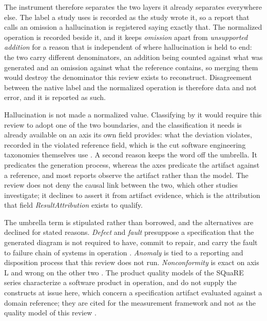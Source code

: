 The instrument therefore separates the two layers it already separates everywhere else. The label a study uses is recorded as the study wrote it, so a report that calls an omission a hallucination is registered saying exactly that. The normalized operation is recorded beside it, and it keeps \textit{omission} apart from \textit{unsupported addition} for a reason that is independent of where hallucination is held to end: the two carry different denominators, an addition being counted against what was generated and an omission against what the reference contains, so merging them would destroy the denominator this review exists to reconstruct. Disagreement between the native label and the normalized operation is therefore data and not error, and it is reported as such.

Hallucination is not made a normalized value. Classifying by it would require this review to adopt one of the two boundaries, and the classification it needs is already available on an axis its own field provides: what the deviation violates, recorded in the violated reference field, which is the cut software engineering taxonomies themselves use \cite{Zhang2025CodeHallucination,Lee2025HallucinationTaxonomy}. A second reason keeps the word off the umbrella. It predicates the generation process, whereas the axes predicate the artifact against a reference, and most reports observe the artifact rather than the model. The review does not deny the causal link between the two, which other studies investigate; it declines to assert it from artifact evidence, which is the attribution that field \textit{ResultAttribution} exists to qualify.

The umbrella term is stipulated rather than borrowed, and the alternatives are declined for stated reasons. \textit{Defect} and \textit{fault} presuppose a specification that the generated diagram is not required to have, commit to repair, and carry the fault to failure chain of systems in operation \cite{Avizienis2004Dependability}. \textit{Anomaly} is tied to a reporting and disposition process that this review does not run. \textit{Nonconformity} is exact on axis L and wrong on the other two \cite{ISO24765,IEEE1044}. The product quality models of the SQuaRE series characterize a software product in operation, and do not supply the constructs at issue here, which concern a specification artifact evaluated against a domain reference; they are cited for the measurement framework and not as the quality model of this review \cite{ISO25010,ISO25020}.


